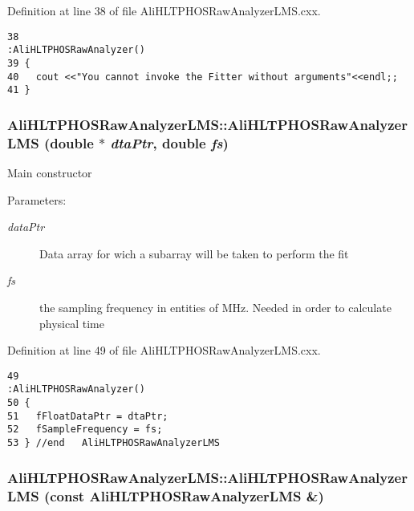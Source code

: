 Definition at line 38 of file Ali\-HLTPHOSRaw\-Analyzer\-LMS.cxx.

\footnotesize\begin{verbatim}38                                                   :AliHLTPHOSRawAnalyzer() 
39 {
40   cout <<"You cannot invoke the Fitter without arguments"<<endl;;
41 }
\end{verbatim}\normalsize 


\subsubsection{\setlength{\rightskip}{0pt plus 5cm}Ali\-HLTPHOSRaw\-Analyzer\-LMS::Ali\-HLTPHOSRaw\-Analyzer\-LMS (double $\ast$ {\em dta\-Ptr}, double {\em fs})}\label{classAliHLTPHOSRawAnalyzerLMS_AliHLTPHOSRawAnalyzerLMSa1}


Main constructor \begin{Desc}
\item[Parameters:]
\begin{description}
\item[{\em data\-Ptr}]Data array for wich a subarray will be taken to perform the fit \item[{\em fs}]the sampling frequency in entities of MHz. Needed in order to calculate physical time \end{description}
\end{Desc}


Definition at line 49 of file Ali\-HLTPHOSRaw\-Analyzer\-LMS.cxx.

\footnotesize\begin{verbatim}49                                                                            :AliHLTPHOSRawAnalyzer() 
50 {
51   fFloatDataPtr = dtaPtr;  
52   fSampleFrequency = fs;
53 } //end   AliHLTPHOSRawAnalyzerLMS 
\end{verbatim}\normalsize 


\subsubsection{\setlength{\rightskip}{0pt plus 5cm}Ali\-HLTPHOSRaw\-Analyzer\-LMS::Ali\-HLTPHOSRaw\-Analyzer\-LMS (const {\bf Ali\-HLTPHOSRaw\-Analyzer\-LMS} \&)}\label{classAliHLTPHOSRawAnalyzerLMS_AliHLTPHOSRawAnalyzerLMSa2}


